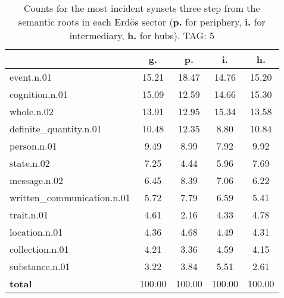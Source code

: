 \begin{table}[h!]
\begin{center}
\begin{tabular}{| l || c | c | c | c |}\hline
 & {\bf g.} & {\bf p.} & {\bf i.} & {\bf h.} \\\hline\hline
event.n.01 & 15.21  & 18.47  & 14.76  & 15.20 \\\hline
cognition.n.01 & 15.09  & 12.59  & 14.66  & 15.30 \\\hline
whole.n.02 & 13.91  & 12.95  & 15.34  & 13.58 \\\hline
definite\_quantity.n.01 & 10.48  & 12.35  & 8.80  & 10.84 \\\hline
person.n.01 & 9.49  & 8.99  & 7.92  & 9.92 \\\hline
state.n.02 & 7.25  & 4.44  & 5.96  & 7.69 \\\hline
message.n.02 & 6.45  & 8.39  & 7.06  & 6.22 \\\hline
written\_communication.n.01 & 5.72  & 7.79  & 6.59  & 5.41 \\\hline
trait.n.01 & 4.61  & 2.16  & 4.33  & 4.78 \\\hline
location.n.01 & 4.36  & 4.68  & 4.49  & 4.31 \\\hline
collection.n.01 & 4.21  & 3.36  & 4.59  & 4.15 \\\hline
substance.n.01 & 3.22  & 3.84  & 5.51  & 2.61 \\\hline\hline
{{\bf total}} & 100.00  & 100.00  & 100.00  & 100.00 \\\hline
\end{tabular}
\caption{Counts for the most incident synsets three step from the semantic roots in each Erd\"os sector ({\bf p.} for periphery, {\bf i.} for intermediary, {\bf h.} for hubs). TAG: 5}
\end{center}
\end{table}